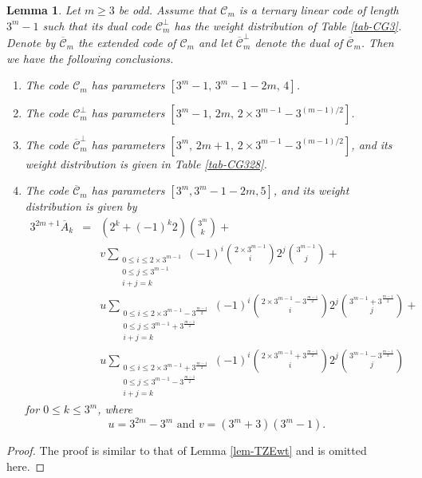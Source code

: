 \documentclass[1p,final]{elsarticle}
\newtheorem{lemma}[theorem]{Lemma}
\newcommand{\C}{{\mathcal{C}}}
\begin{document}
\begin{lemma}\label{lem-TZEwt28} 
Let $m \geq 3$ be odd. Assume that $\C_m$ is a ternary linear code of length $3^m-1$ such that 
its dual code $\C_m^\perp$ has the weight distribution of Table \ref{tab-CG3}. Denote by 
$\overline{\C}_m$ the extended code of $\C_m$ and let $\overline{\C}_m^\perp$ denote the dual 
of $\overline{\C}_m$. 
Then we have the following conclusions. 
\begin{enumerate}
\item The code $\C_m$ has parameters $[3^m-1, \, 3^m-1-2m, \, 4]$.  
\item The code $\C_m^\perp$ has parameters $[3^m-1, \, 2m, \, 2\times 3^{m-1}-3^{(m-1)/2}]$.  
\item The code $\overline{\C}_m^\perp$ has parameters $[3^m, \, 2m+1, \, 2\times 3^{m-1}-3^{(m-1)/2}]$, 
and its 
      weight distribution is given in Table \ref{tab-CG328}.    
\item The code $\overline{\C}_m$ has parameters $[3^m, 3^m-1-2m, 5]$, and its weight distribution
is given by 
\begin{eqnarray*}
3^{2m+1}\overline{A}_k &=&   (2^k+(-1)^k 2) \binom{3^m}{k} + \\ 
& & v \sum_{\substack{0 \le i \le 2 \times 3^{m-1} \\
0\le j \le 3^{m-1} \\i+j=k}}(-1)^i \binom{2 \times 3^{m-1}} {i} 2^j \binom{3^{m-1}}{j}   + \\ 
& & u \sum_{\substack{0 \le i \le 2\times 3^{m-1}-3^{\frac{m-1}{2}} \\
0\le j \le 3^{m-1}+3^{\frac{m-1}{2}} \\i+j=k}}(-1)^i \binom{2 \times 3^{m-1}-3^{\frac{m-1}{2}}} {i} 2^j \binom{3^{m-1}+3^{\frac{m-1}{2}}}{j} + \\
& & u  
\sum_{\substack{0 \le i \le 2 \times 3^{m-1}+3^{\frac{m-1}{2} } \\
0\le j \le 3^{m-1}-3^{\frac{m-1}{2}} \\i+j=k}}(-1)^i \binom{2 \times 3^{m-1}+3^{\frac{m-1}{2}}}{i}2^j \binom{3^{m-1}-3^{\frac{m-1}{2}}}{j} 
\end{eqnarray*}
for $0 \le k \le 3^m$, where 
$$ 
u=3^{2m}-3^{m} \mbox{ and } v = (3^m+3)(3^m-1). 
$$
\end{enumerate}
\end{lemma}

\begin{proof}
The proof is similar to that of Lemma \ref{lem-TZEwt} and is omitted here. 
\end{proof}
\end{document}
